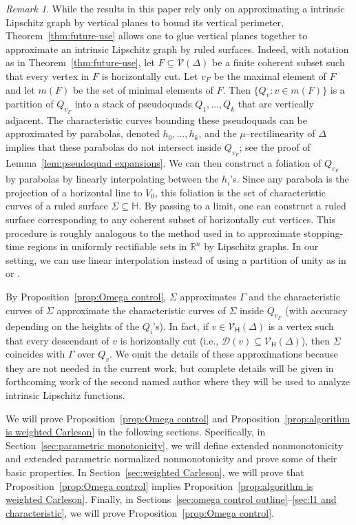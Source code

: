 \documentclass[11pt,reqno]{amsart}
\renewcommand{\H}{\mathbb{H}}
\newcommand{\R}{\mathbb{R}}
\newcommand{\cD}{\mathcal{D}}
\newcommand{\cV}{\mathcal{V}}
\newcommand{\0}{\mathbf{0}}
\renewcommand{\1}{\mathbf 1}
\renewcommand{\mid}{:}
\renewcommand{\subset}{\subseteq}
\theoremstyle{remark}
\newtheorem{remark}[thm]{Remark}
\newcommand{\cVh}{{\mathcal{V}_{\mathsf{H}}}}
\begin{document}
\begin{remark}\label{rem:ruled-surfaces}
  While the results in this paper rely only on approximating a intrinsic Lipschitz graph by vertical planes to bound its vertical perimeter, Theorem~\ref{thm:future-use} allows one to glue vertical planes together to approximate an intrinsic Lipschitz graph by ruled surfaces. Indeed, with notation as in Theorem~\ref{thm:future-use}, let $F\subset \cV(\Delta)$ be a finite coherent subset such that every vertex in $F$ is horizontally cut. Let $v_F$ be the maximal element of $F$ and let $m(F)$ be the set of minimal elements of $F$. Then $\{Q_v\mid v\in m(F)\}$ is a partition of $Q_{v_F}$ into a stack of pseudoquads $Q_1,\dots, Q_k$ that are vertically adjacent. The characteristic curves bounding these pseudoquads can be approximated by parabolas, denoted $h_0,\dots, h_k$, and the $\mu$--rectilinearity of $\Delta$ implies that these parabolas do not intersect inside $Q_{v_F}$; see the proof of Lemma~\ref{lem:pseudoquad expansions}. We can then construct a foliation of $Q_{v_F}$ by parabolas by linearly interpolating between the $h_i$'s. Since any parabola is the projection of a horizontal line to $V_0$, this foliation is the set of characteristic curves of a ruled surface $\Sigma\subset \H$. By passing to a limit, one can construct a ruled surface corresponding to any coherent subset of horizontally cut vertices.  This procedure is roughly analogous to the method used in \cite{DavidSemmesSingular} to approximate stopping-time regions in uniformly rectifiable sets in $\R^n$ by Lipschitz graphs. In our setting, we can use linear interpolation instead of using a partition of unity as in \cite{DavidSemmesSingular} or \cite{NY18}.

  By Proposition~\ref{prop:Omega control}, $\Sigma$ approximates $\Gamma$ and the characteristic curves of $\Sigma$ approximate the characteristic curves of $\Sigma$ inside $Q_{v_F}$ (with accuracy depending on the heights of the $Q_i$'s). In fact, if $v\in \cVh(\Delta)$ is a vertex such that every descendant of $v$ is horizontally cut (i.e., $\cD(v)\subset \cVh(\Delta)$), then $\Sigma$ coincides with $\Gamma$ over $Q_v$.
  We omit the details of these approximations because they are not needed in the current work, but complete details will be given in forthcoming work of the second named author where they will be used to analyze intrinsic Lipschitz functions.
\end{remark}

We will prove Proposition~\ref{prop:Omega control} and Proposition~\ref{prop:algorithm is weighted Carleson} in the following  sections.  Specifically, in Section~\ref{sec:parametric monotonicity}, we will define extended nonmonotonicity and extended parametric normalized nonmonotonicity and prove some of their basic properties.  In Section~\ref{sec:weighted Carleson}, we will prove that Proposition~\ref{prop:Omega control} implies Proposition~\ref{prop:algorithm is weighted Carleson}.  Finally, in Sections~\ref{sec:omega control outline}--\ref{sec:l1 and characteristic}, we will prove Proposition~\ref{prop:Omega control}.
\end{document}
